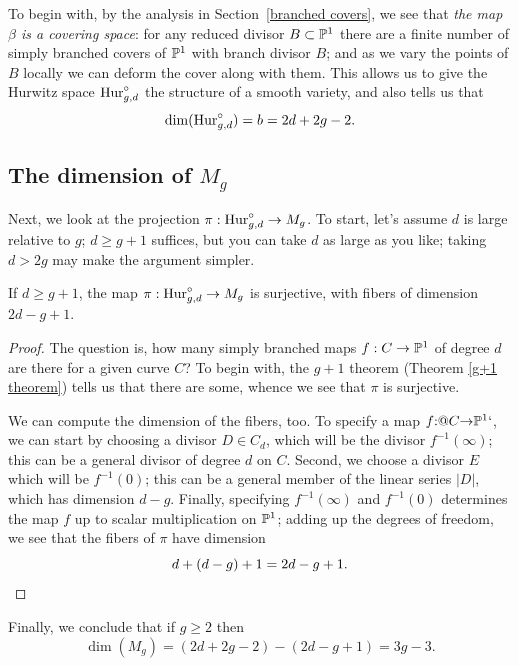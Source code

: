 To begin with, by the analysis in Section~\ref{branched covers}, we
see that \emph{the map $\beta$ is a covering space}: for any reduced
divisor $B \subset {\mathbb P}^1$ there are a finite number of simply branched
covers of ${\mathbb P}^1$ with branch divisor $B$; and as we vary the points
of $B$ locally we can deform the cover along with them. This allows us
to give the Hurwitz space $\mathrm{Hur}^\circ_{g,d}$ the structure of a smooth
variety, and also tells us that
$$
\vspace*{-4pt}
\dim(\Hur^\circ_{g,d}) = b = 2d+2g-2.
\vspace*{-4pt}
$$

\subsection*{The dimension of $M_g$}

Next, we look at the projection $\pi : \mathrm{Hur}^\circ_{g,d} \to M_g$. To
%
start, let's assume $d$ is large relative to $g$; $d \geq g+1$
suffices, but you can take $d$ as large as you like; taking $d > 2g$
may make the argument simpler.

\begin{proposition}
If $d \geq g+1$, the map $\pi :
\mathrm{Hur}^\circ_{g,d} \to M_g$ is surjective, with fibers of dimension $2d-g+1$.
\end{proposition}

\begin{proof}
The question is, how many simply branched maps $f : C \to {\mathbb P}^1$ of
degree $d$ are there
for a given curve $C$?
To begin with, the
$g+1$ theorem
%
(Theorem \ref{g+1 theorem}) tells us that
there are some, whence we see that $\pi$ is surjective.

We can compute the dimension of the fibers, too.
\kern-1pt To specify a map
$f {:}@ C {\to} {\mathbb P}^1`$,
we can start by choosing a divisor $D \in C_d$, which
will be the divisor $f^{-1}(\infty)$; this can be a general divisor of
degree $d$ on $C$. Second, we choose a divisor $E$ which will be
$f^{-1}(0)$; this can be a general member of the linear series $|D|$,
which has dimension $d-g$. Finally, specifying $f^{-1}(\infty)$ and
$f^{-1}(0)$ determines the map $f$ up to scalar multiplication on
${\mathbb P}^1$; adding up the degrees of freedom, we see that the fibers of
$\pi$ have dimension
$$
d + (d-g) + 1 = 2d-g+1.
\qed
$$
\let\qed\relax
\end{proof}

Finally, we conclude that if $g\geq2$ then
$$
\dim(M_g) = (2d+2g-2) - (2d - g + 1) = 3g-3.
$$


